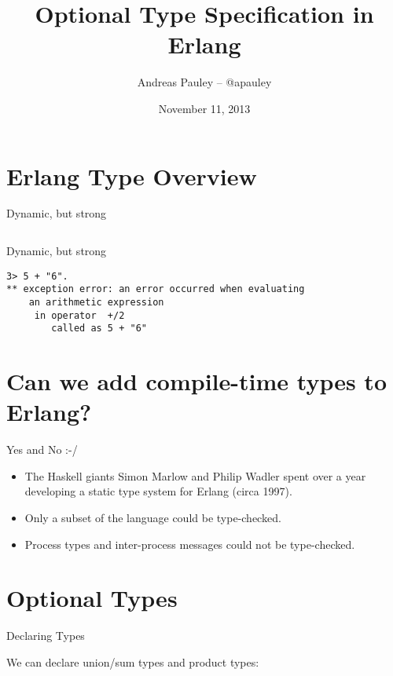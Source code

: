 \documentclass{beamer}
\title[Types in Erlang]{Optional Type Specification in Erlang}
\author{Andreas Pauley -- @apauley}
\institute{Lambda Luminaries -- @lambdaluminary}
\date{November 11, 2013}
\begin{document}
\begin{frame}
  \titlepage
\end{frame}

\section{Erlang Type Overview}

\begin{frame}{Dynamic, but strong}

  \inputminted[firstline=5]{erlang}{src/dynamic.erl}

\end{frame}

\begin{frame}[fragile]{Dynamic, but strong}

  \begin{verbatim}
3> 5 + "6".
** exception error: an error occurred when evaluating
    an arithmetic expression
     in operator  +/2
        called as 5 + "6"
  \end{verbatim}

\end{frame}

\section{Can we add compile-time types to Erlang?}

\begin{frame}{Yes and No :-/}

  \begin{itemize}[<+->]
  \item The Haskell giants Simon Marlow and Philip Wadler spent over a year
    developing a static type system for Erlang (circa 1997).
  \item Only a subset of the language could be type-checked.
  \item Process types and inter-process messages could not be type-checked.
  \end{itemize}

\end{frame}

\section{Optional Types}

\begin{frame}{Declaring Types}

We can declare union/sum types and product types:

  \inputminted[firstline=4, lastline=6]{erlang}{src/cards.erl}

\end{frame}
\end{document}
